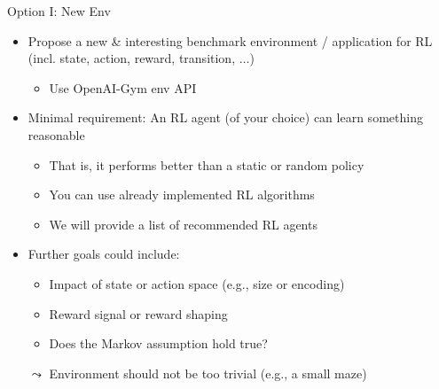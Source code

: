 \begin{frame}[c]{Option I: New Env}
	
	\begin{itemize}
		\item Propose a new \& interesting benchmark environment / application for RL (incl. state, action, reward, transition, $\ldots$)
		\begin{itemize}
			\item Use OpenAI-Gym env API
		\end{itemize}
		\item Minimal requirement: An RL agent (of your choice) can learn something reasonable
		\begin{itemize}
			\item That is, it performs better than a static or random policy
			\item You can use already implemented RL algorithms
			\item We will provide a list of recommended RL agents
		\end{itemize}
		\item Further goals could include:
		\begin{itemize}
			\item Impact of state or action space (e.g., size or encoding)
			\item Reward signal or reward shaping
			\item Does the Markov assumption hold true?
		\end{itemize}
		\item[$\leadsto$] Environment should not be too trivial (e.g., a small maze)
	\end{itemize}
	
\end{frame}
